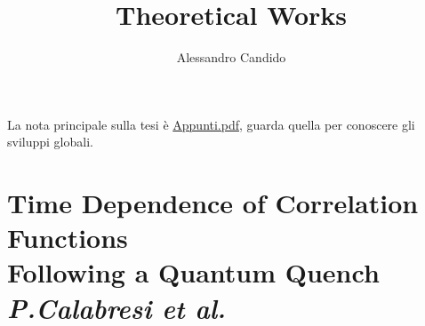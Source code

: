 \documentclass[a4paper,10pt]{article}
\title{Theoretical Works}
\author{Alessandro Candido}
\begin{document}
\maketitle
\tableofcontents

\section*{}

La nota principale sulla tesi è \href{./Appunti.pdf}{Appunti.pdf}, guarda quella per conoscere gli sviluppi globali.

\section{Time Dependence of Correlation Functions \\Following a Quantum Quench\\ \textit{P.Calabresi et al.}}
\end{document}
